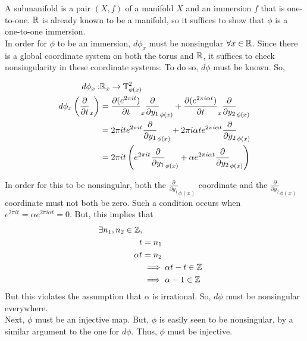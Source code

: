 A submanifold is a pair $(X, f)$ of a manifold $X$ and an immersion $f$ that is
one-to-one. $\mathbb{R}$ is already known to be a manifold, so it suffices to show that
$\phi$ is a one-to-one immersion.
\\
In order for $\phi$ to be an immersion, $d\phi_x$ must be nonsingular
$\forall x \in \mathbb{R}$. Since there is a global coordinate system on both the torus
and $\mathbb{R}$, it suffices to check nonsingularity in these coordinate systems. To do
so, $d\phi$ must be known. So,
\begin{center}
\[
\begin{aligned}
d\phi_x: &\mathbb{R}_x \to \mathbb{T}^2_{\phi(x)}              \\
d\phi_x\left(\frac{\partial}{\partial t}_x \right)     &=
        \frac{\partial(e^{2 \pi it})}{\partial t}_x
        \frac{\partial}{\partial y_1}_{\phi(x)} +
        \frac{\partial(e^{2 \pi i\alpha t})}{\partial t}_x
        \frac{\partial}{\partial y_2}_{\phi(x)}        \\
      &=2\pi ite^{2 \pi it}
        \frac{\partial}{\partial y_1}_{\phi(x)} +
        2\pi i \alpha te^{2\pi i\alpha t}
        \frac{\partial}{\partial y_2}_{\phi(x)}        \\
      &=2\pi it\left(e^{2 \pi it}
        \frac{\partial}{\partial y_1}_{\phi(x)} +
        \alpha e^{2\pi i\alpha t}
        \frac{\partial}{\partial y_2}_{\phi(x)}\right) \\
\end{aligned}
\]
\end{center}
In order for this to be nonsingular, both the
$\frac{\partial}{\partial y_1}_{\phi(x)}$ coordinate and the
$\frac{\partial}{\partial y_2}_{\phi(x)}$ coordinate must not both be zero.
Such a condition occurs when $e^{2\pi it}=\alpha e^{2\pi i \alpha t} = 0$.
But, this implies that
\[
\begin{aligned}
    \exists n_1, n_2 \in \mathbb{Z}, \\
       t        &= n_1 \\
       \alpha t &= n_2 \\
    &\implies \alpha t - t \in \mathbb{Z} \\
    &\implies \alpha - 1 \in \mathbb{Z}
\end{aligned}
\]
But this violates the assumption that $\alpha$ is irrational. So, $d\phi$ must
be nonsingular everywhere.
\\
Next, $\phi$ must be an injective map.
But, $\phi$ is easily seen to be nonsingular, by a similar argument to the one for
$d\phi$. Thus, $\phi$ must be injective.

